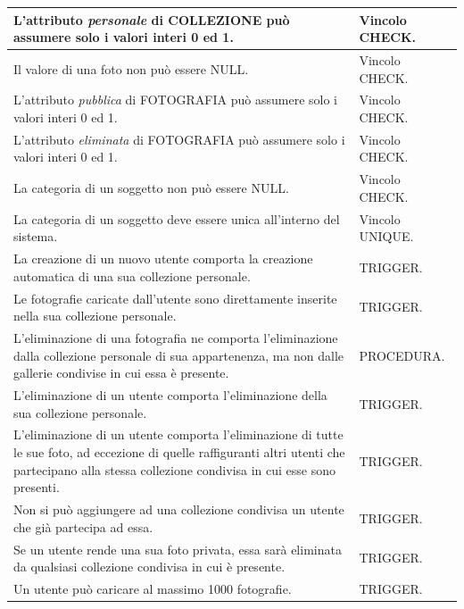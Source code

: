 \documentclass[a4paper]{article}
\begin{document}
	\begin{tabular}{p{150pt}p{100pt}}
		L'attributo \emph{personale} di COLLEZIONE può
		assumere solo
		i valori interi 0 ed 1.&
		Vincolo CHECK.
		\\
		\hline
		
		Il valore di una foto non può essere NULL.&
		Vincolo CHECK.
		\\
		\hline	
		
		L'attributo \emph{pubblica} di FOTOGRAFIA può
		assumere solo
		i valori interi 0 ed 1.&
		Vincolo CHECK.
		\\
		\hline	
		
		L'attributo \emph{eliminata} di FOTOGRAFIA può
		assumere solo
		i valori interi 0 ed 1.&
		Vincolo CHECK.
		\\
		\hline	
		
		La categoria di un soggetto non può essere NULL.&
		Vincolo CHECK.
		\\
		\hline	
		
		La categoria di un soggetto deve essere unica
		all'interno del sistema.&
		Vincolo UNIQUE.
		\\
		\hline	
		
		La creazione di un nuovo utente comporta la creazione
		automatica di
		una sua collezione personale.&
		TRIGGER.
		\\
		\hline
		
		Le fotografie caricate dall'utente sono
		direttamente inserite nella sua collezione
		personale. &
		TRIGGER.
		\\
		\hline

		L'eliminazione di una fotografia ne comporta
		l'eliminazione
		dalla collezione personale di sua appartenenza, ma
		non dalle gallerie
		condivise in cui essa è presente. &
		PROCEDURA.
		\\
		\hline
		
		L'eliminazione di un utente comporta l'eliminazione
		della sua collezione personale. &
		TRIGGER.
		\\
		\hline

		L'eliminazione di un utente comporta l'eliminazione
		di tutte le sue foto, ad eccezione di quelle
		raffiguranti altri utenti che partecipano alla stessa
		collezione condivisa in cui esse sono presenti. &
		TRIGGER.
		\\
		\hline
		
		Non si può aggiungere ad una collezione condivisa un
		utente che già partecipa ad essa. &
		TRIGGER.
		\\
		\hline
		
		Se un utente rende una sua foto privata, essa sarà
		eliminata da qualsiasi collezione condivisa in cui è
		presente. &
		TRIGGER.
		\\
		\hline

		Un utente può caricare al massimo 1000 fotografie.&
		TRIGGER.
		\\
		\hline
	\end{tabular}
	
\end{document}
